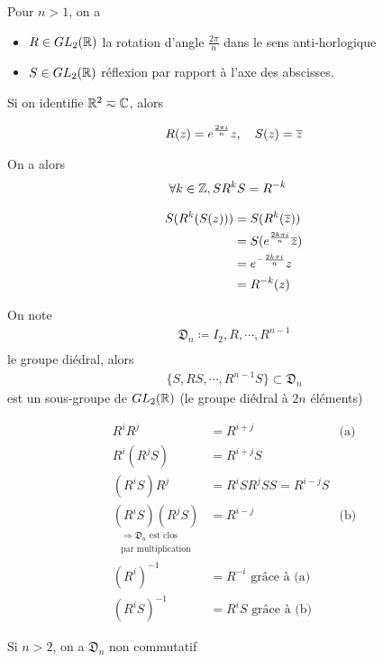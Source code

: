 \documentclass[french,a4paper,10pt]{article}
\begin{document}
	\begin{myexample}
		Pour $n>1$, on a
		\begin{itemize}[]
			\item 
			$R\in GL_2(\mathbb{R})$ la rotation d'angle $\frac{2\pi}n$ dans le sens anti-horlogique
			
			\item 
			$S\in GL_2(\mathbb{R})$ réflexion par rapport à l'axe des abscisses. 
		\end{itemize}
			
			Si on identifie $\mathbb{R}^2\eqsim\mathbb{C}$, alors
			
			\[\begin{aligned}
				R(z)=e^{\frac{2\pi i}n} z,\quad S(z)=\overline{z}
			\end{aligned}\]
			
			On a alors 
			\[\begin{aligned}
				\forall k\in\mathbb{Z}, SR^kS&=R^{-k}
			\end{aligned}\]
			
			\begin{myproof}
				\[\begin{aligned}
					S(R^k(S(z)))&=S(R^k(\overline{z}))\\
					&=S(e^{\frac{2k\pi i}n}\overline{z})\\
					&=e^{-\frac{2k\pi i}n}z\\
					&= R^{-k}(z)
				\end{aligned}\]
			\end{myproof}
			
			\begin{proposition}
			On note
			\[\begin{aligned}
				\mathfrak{D}_n\coloneq {I_2, R, \cdots, R^{n-1}}\\
			\end{aligned}\]
			le groupe diédral, alors
			\[\begin{aligned}
				\{S, RS, \cdots, R^{n-1}S\} \subset \mathfrak D_n
			\end{aligned}\]
			est un sous-groupe de $GL_2(\mathbb{R})$ (le groupe diédral à $2n$ éléments)
			\end{proposition}
			\begin{myproof}
			
			\[\begin{aligned}
				R^iR^j&=R^{i+j}&\text{(a)}\\
				R^i(R^jS)&=R^{i+j}S\\
				(R^iS)R^j&=R^iSR^jSS=R^{i-j}S\\
				\underset{\substack{\Rightarrow \mathfrak D_n\text{ est clos}\\ \text{par multiplication}}}{(R^iS)(R^jS)}&=R^{i-j}&\text{(b)}\\
				(R^i)^{-1}&=R^{-i}\text{ grâce à (a)}\\
				(R^iS)^{-1}&=R^iS\text{ grâce à (b)}
			\end{aligned}\]
			\end{myproof}
			
			\begin{myremark}
				Si $n>2$, on a $\mathfrak{D}_n$ non commutatif
			\end{myremark}
	\end{myexample}
	
\end{document}
